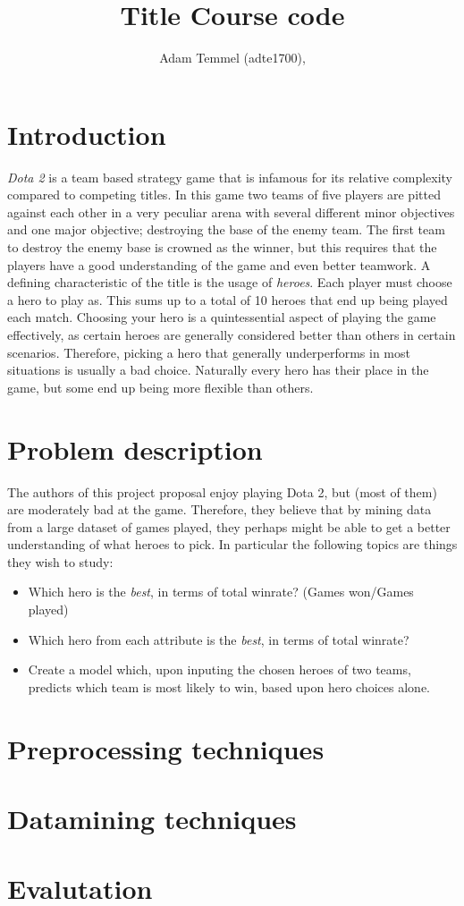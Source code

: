 \documentclass[a4paper, titlepage,12pt]{article}
\title{Title
\large Course code}
\author{Adam Temmel (adte1700),}
\begin{document}
	\maketitle
	\section{Introduction}\label{sec:introduction}
		\textit{Dota 2} is a team based strategy game that is infamous for its relative complexity compared to competing titles. In this game two teams of five players are pitted against each other in a very peculiar arena with several different minor objectives and one major objective; destroying the base of the enemy team. The first team to destroy the enemy base is crowned as the winner, but this requires that the players have a good understanding of the game and even better teamwork. A defining characteristic of the title is the usage of \textit{heroes}. Each player must choose a hero to play as. This sums up to a total of 10 heroes that end up being played each match. Choosing your hero is a quintessential aspect of playing the game effectively, as certain heroes are generally considered better than others in certain scenarios. Therefore, picking a hero that generally underperforms in most situations is usually a bad choice. Naturally every hero has their place in the game, but some end up being more flexible than others.
	\section{Problem description}\label{sec:problem}
		The authors of this project proposal enjoy playing Dota 2, but (most of them) are moderately bad at the game. Therefore, they believe that by mining data from a large dataset of games played, they perhaps might be able to get a better understanding of what heroes to pick. In particular the following topics are things they wish to study:
		\begin{itemize}
			\item Which hero is the \textit{best}, in terms of total winrate? (Games won/Games played)
			\item Which hero from each attribute is the \textit{best}, in terms of total winrate?
			\item Create a model which, upon inputing the chosen heroes of two teams, predicts which team is most likely to win, based upon hero choices alone.
		\end{itemize}
	\section{Preprocessing techniques}
	\section{Datamining techniques}
	\section{Evalutation}
	\printbibliography
\end{document}

